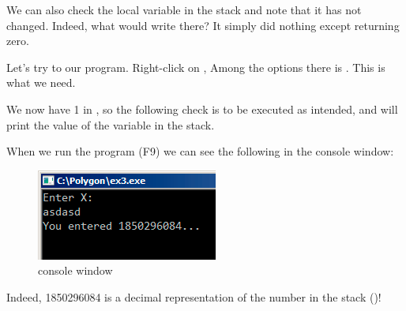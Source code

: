 We can also check the local variable in the stack and note that it has not changed.
Indeed, what would \scanf write there?
It simply did nothing except returning zero.

Let's try to  our program.
Right-click on \EAX, 
Among the options there is .
This is what we need.

We now have 1 in \EAX, so the following check is to be executed as intended, 
and \printf will print the value of the variable in the stack.

When we run the program (F9) we can see the following in the console window:

\begin{figure}[H]
\centering
\includegraphics[scale=\FigScale]{patterns/04_scanf/3_checking_retval/olly_3.png}
\caption{console window}
\end{figure}

Indeed, 1850296084 is a decimal representation of the number in the stack ()!
